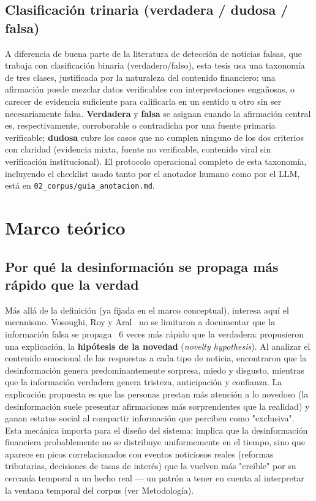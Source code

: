 \subsection{Clasificación trinaria (verdadera / dudosa / falsa)}

A diferencia de buena parte de la literatura de detección de noticias falsas, que trabaja con clasificación binaria (verdadero/falso), esta tesis usa una taxonomía de tres clases, justificada por la naturaleza del contenido financiero: una afirmación puede mezclar datos verificables con interpretaciones engañosas, o carecer de evidencia suficiente para calificarla en un sentido u otro sin ser necesariamente falsa. \textbf{Verdadera} y \textbf{falsa} se asignan cuando la afirmación central es, respectivamente, corroborable o contradicha por una fuente primaria verificable; \textbf{dudosa} cubre los casos que no cumplen ninguno de los dos criterios con claridad (evidencia mixta, fuente no verificable, contenido viral sin verificación institucional). El protocolo operacional completo de esta taxonomía, incluyendo el checklist usado tanto por el anotador humano como por el LLM, está en \texttt{02\_corpus/guia\_anotacion.md}.

\section{Marco teórico}

\subsection{Por qué la desinformación se propaga más rápido que la verdad}

Más allá de la definición (ya fijada en el marco conceptual), interesa aquí el mecanismo. Vosoughi, Roy y Aral~\cite{Vosoughi2018} no se limitaron a documentar que la información falsa se propaga ~6 veces más rápido que la verdadera: propusieron una explicación, la \textbf{hipótesis de la novedad} (\textit{novelty hypothesis}). Al analizar el contenido emocional de las respuestas a cada tipo de noticia, encontraron que la desinformación genera predominantemente sorpresa, miedo y disgusto, mientras que la información verdadera genera tristeza, anticipación y confianza. La explicación propuesta es que las personas prestan más atención a lo novedoso (la desinformación suele presentar afirmaciones más sorprendentes que la realidad) y ganan estatus social al compartir información que perciben como "exclusiva". Esta mecánica importa para el diseño del sistema: implica que la desinformación financiera probablemente no se distribuye uniformemente en el tiempo, sino que aparece en picos correlacionados con eventos noticiosos reales (reformas tributarias, decisiones de tasas de interés) que la vuelven más "creíble" por su cercanía temporal a un hecho real — un patrón a tener en cuenta al interpretar la ventana temporal del corpus (ver Metodología).

